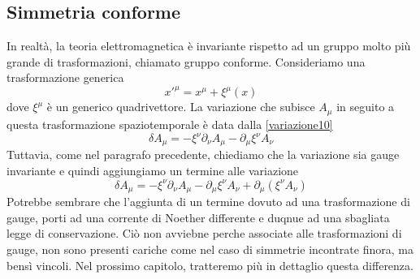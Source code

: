 \subsection{Simmetria conforme}
    In realtà, la teoria elettromagnetica è invariante rispetto ad un gruppo molto più grande di trasformazioni, chiamato gruppo conforme. Consideriamo una trasformazione generica
\begin{equation*}
    x'^\mu = x^\mu + \xi^\mu(x)
\end{equation*}
    dove $\xi^\mu$ è un generico quadrivettore. La variazione che subisce $A_\mu$ in seguito a questa trasformazione spaziotemporale è data dalla \eqref{variazione10}
\begin{equation*}
    \delta A_\mu = - \xi^\nu \partial_\nu A_\mu - \partial_\mu \xi^\nu A_\nu
\end{equation*}
    Tuttavia, come nel paragrafo precedente, chiediamo che la variazione sia gauge invariante e quindi aggiungiamo un termine alle variazione
\begin{equation*}
    \delta A_\mu = - \xi^\nu \partial_\nu A_\mu - \partial_\mu \xi^\nu A_\nu + \partial_\mu(\xi^\nu A_\nu)
\end{equation*}
    Potrebbe sembrare che l'aggiunta di un termine dovuto ad una trasformazione di gauge, porti ad una corrente di Noether differente e duqnue ad una sbagliata legge di conservazione. Ciò non avviebne perche associate alle trasformazioni di gauge, non sono presenti cariche come nel caso di simmetrie incontrate finora, ma bensì vincoli. Nel prossimo capitolo, tratteremo più in dettaglio questa differenza. 

